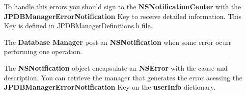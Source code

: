 To handle this errors you should sign to the {\bfseries NSNotificationCenter} with the {\bfseries JPDBManagerErrorNotification} Key to receive detailed information. This Key is defined in \hyperlink{_j_p_d_b_manager_definitions_8h_source}{JPDBManagerDefinitions.h} file.\par
 \par
 The {\bfseries Database Manager} post an {\bfseries NSNotification} when some error ocurr performing one operation. \par
 \par
 The {\bfseries NSNotification} object encapsulate an {\bfseries NSError} with the cause and description. You can retrieve the manager that generates the error acessing the {\bfseries JPDBManagerErrorNotification} Key on the {\bfseries userInfo} dictionary. 